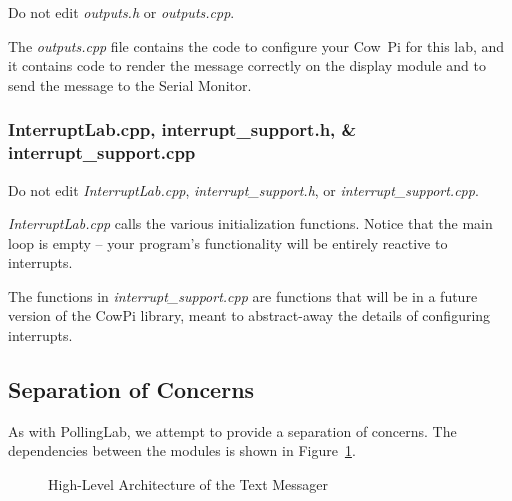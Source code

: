Do not edit \textit{outputs.h} or \textit{outputs.cpp}.

The \textit{outputs.cpp} file contains the code to configure your Cow~Pi for this lab,
and it contains code to render the message correctly on the display module and to send the message to the Serial Monitor.

\subsubsection{InterruptLab.cpp, interrupt\_support.h, \& interrupt\_support.cpp}

Do not edit \textit{InterruptLab.cpp}, \textit{interrupt\_support.h}, or \textit{interrupt\_support.cpp}.

\textit{InterruptLab.cpp} calls the various initialization functions.
Notice that the main loop is empty   -- your program's functionality will be entirely reactive to interrupts.

The functions in \textit{interrupt\_support.cpp} are functions that will be in a future version of the CowPi library,
meant to abstract-away the details of configuring interrupts.


\subsection{Separation of Concerns}

As with PollingLab, we attempt to provide a separation of concerns.
The dependencies between the modules is shown in Figure~\ref{fig:architecture}.

\begin{figure}
    \centering
    \caption{High-Level Architecture of the Text Messager} \label{fig:architecture}
\end{figure}

